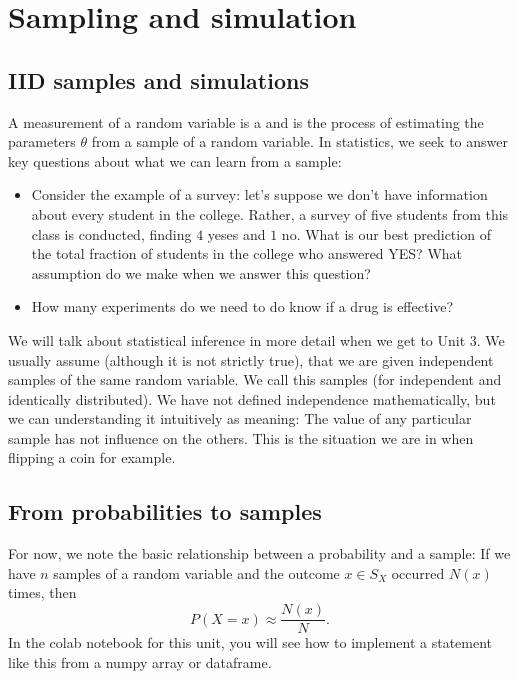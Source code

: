  
\section{Sampling and simulation}

\subsection{IID samples and simulations}
A measurement of a random variable is a  and   is the process of estimating the parameters $\theta$ from a sample of a random variable. In statistics, we seek to answer key questions about what we can learn from a sample:
\begin{itemize}
\item Consider the example of a survey: let's suppose we don't have information about every student in the college. Rather, a survey of five students from this class is conducted, finding $4$ yeses and $1$ no. What is our best prediction of the total fraction of students in the college who answered YES? What assumption do we make when we answer this question? 
\item How many experiments do we need to do know if a drug is effective? 
\end{itemize}
We will talk about statistical inference in more detail when we get to Unit 3. 
We usually assume (although it is not strictly true), that we are given independent samples of the same random variable. We call this  samples (for independent and identically distributed).  We have not defined independence mathematically, but we can understanding it intuitively as meaning: The value of any particular sample has not influence on the others. This is the situation we are in when flipping a coin for example. 


\subsection{From probabilities to samples}
For now, we note the basic relationship between a probability and a sample: If we have $n$ samples of a random variable and the outcome $x \in S_X$ occurred $N(x)$ times, then 
\begin{equation}
P(X=x) \approx \frac{N(x)}{N}.
\end{equation}
In the colab notebook for this unit, you will see how to implement a statement like this from a numpy array or dataframe.  


